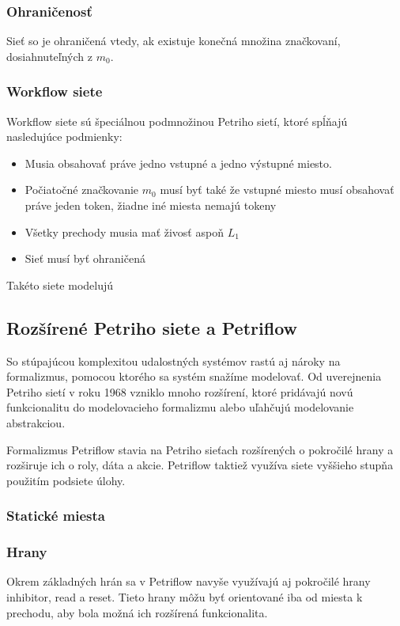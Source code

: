 \subsubsection{Ohraničenosť}
Sieť so je ohraničená vtedy, ak existuje konečná množina značkovaní, dosiahnuteľných z $m_0$.

\subsubsection{Workflow siete}
Workflow siete sú špeciálnou podmnožinou Petriho sietí, ktoré spĺňajú nasledujúce podmienky:
\begin{itemize}
\item Musia obsahovať práve jedno vstupné a jedno výstupné miesto.
\item Počiatočné značkovanie $m_0$ musí byť také že vstupné miesto musí obsahovať práve jeden token, žiadne iné miesta nemajú tokeny
\item Všetky prechody musia mať živosť aspoň $L_1$ 
\item Sieť musí byť ohraničená
\end{itemize}
Takéto siete modelujú 

\subsection{Rozšírené Petriho siete a Petriflow}

So stúpajúcou komplexitou udalostných systémov rastú aj nároky na formalizmus, pomocou ktorého sa systém snažíme modelovať. 
Od uverejnenia Petriho sietí v roku 1968 vzniklo mnoho rozšírení, ktoré pridávajú novú funkcionalitu do modelovacieho formalizmu alebo uľahčujú modelovanie abstrakciou. 

Formalizmus Petriflow stavia na Petriho sieťach rozšírených o pokročilé hrany a rozširuje ich o roly, dáta a akcie. Petriflow taktiež využíva siete vyššieho stupňa použitím podsiete úlohy.

\subsubsection{Statické miesta}

\subsubsection{Hrany}
Okrem základných hrán sa v Petriflow navyše využívajú aj pokročilé hrany inhibitor, read a reset. Tieto hrany môžu byť orientované iba od miesta k prechodu, aby bola možná ich rozšírená funkcionalita.

